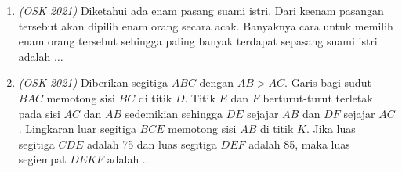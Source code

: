 \begin{enumerate}
	\item \textit{(OSK 2021)} Diketahui ada enam pasang suami istri. Dari keenam pasangan tersebut akan dipilih enam orang secara acak. Banyaknya cara untuk memilih enam orang tersebut sehingga paling banyak terdapat sepasang suami istri adalah $\dots$
	
	\item \textit{(OSK 2021)}  Diberikan segitiga $ABC$ dengan $AB > AC$. Garis bagi sudut $BAC$ memotong sisi $BC$ di titik $D$. Titik $E$ dan $F$ berturut-turut terletak pada sisi $AC$ dan $AB$ sedemikian sehingga $DE$ sejajar $AB$ dan $DF$ sejajar $AC$. Lingkaran luar segitiga $BCE$ memotong sisi $AB$ di titik $K$. Jika luas segitiga $CDE$ adalah 75 dan luas segitiga $DEF$ adalah 85, maka luas segiempat $DEKF$ adalah $\dots$
\end{enumerate}

